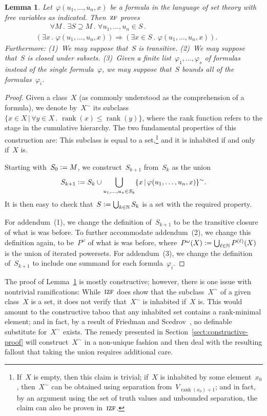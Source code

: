 \documentclass[oneside,reqno]{amsart}
\theoremstyle{definition}
\theoremstyle{plain}
\newtheorem{lemma}[defn]{Lemma}
\theoremstyle{remark}
\newcommand{\NN}{\mathbb{N}}
\newcommand{\defeq}{\vcentcolon=}
\DeclareMathOperator{\rank}{rank}
\renewcommand{\_}{\mathpunct{.}\,}
\newcommand{\?}{\,{:}\,}
\newcommand{\ZF}{\textsc{zf}}
\newcommand{\IZF}{\textsc{izf}}
\begin{document}
\begin{lemma}\label{lemma:zf-smallstep}
Let~$\varphi(u_1,\ldots,u_n,x)$ be a formula in the language of set
theory with free variables as indicated. Then~$\ZF$ proves
\begin{multline*}
  {\qquad}\forall M\_
  \exists S \supseteq M\_
  \forall u_1,\ldots,u_n \in S\_ \\
  (\exists x\_ \varphi(u_1,\ldots,u_n,x)) \Longrightarrow
  (\exists x \in S\_ \varphi(u_1,\ldots,u_n,x)).{\qquad}
\end{multline*}
Furthermore: (1)~We may suppose that~$S$ is transitive. (2)~We may suppose that~$S$ is
closed under subsets. (3)~Given a finite list~$\varphi_1,\ldots,\varphi_s$
of formulas instead of the single formula~$\varphi$, we may suppose that~$S$
bounds all of the formulas~$\varphi_i$.
\end{lemma}

\begin{proof}Given a class~$X$ (as commonly understood as the comprehension of
a formula), we denote by~$X^\sim$ its subclass~$\{ x \in X \,|\, \forall y
\in X\_ \rank(x) \leq \rank(y) \}$, where the rank function refers to the stage
in the cumulative hierarchy. The two fundamental properties of this construction are:
This subclass is equal to a set,\footnote{If~$X$ is empty, then
this claim is trivial; if~$X$ is inhabited by some element~$x_0$, then~$X^\sim$ can
be obtained using separation from~$V_{\rank(x_0)+1}$; and in fact, by an argument
using the set of truth values and unbounded separation, the claim can also be
proven in~$\IZF$.} and it is inhabited if and only if~$X$ is.

Starting with~$S_0 \defeq M$, we construct~$S_{k+1}$ from~$S_k$ as the union
\[ S_{k+1} \defeq S_k \cup \bigcup_{u_1,\ldots,u_n \in S_k} \{ x \,|\,
\varphi(u_1,\ldots,u_n,x) \}^\sim. \]
It is then easy to check that~$S \defeq \bigcup_{k \in \NN} S_k$ is a set with the
required property.

For addendum~(1), we change the definition of~$S_{k+1}$ to be the transitive
closure of what is was before. To further accommodate addendum~(2), we change
this definition again, to be~$P^\omega$ of what is was before,
where~$P^\omega(X) \defeq \bigcup_{\ell \in \NN} P^{(\ell)}(X)$ is the union of
iterated powersets. For addendum~(3), we change the definition of~$S_{k+1}$ to
include one summand for each formula~$\varphi_i$.
\end{proof}

The proof of Lemma~\ref{lemma:zf-smallstep} is mostly constructive; however,
there is one issue with nontrivial ramifications: While~$\IZF$ does show
that the subclass~$X^\sim$ of a given class~$X$ is a set, it does not verify
that~$X^\sim$ is inhabited if~$X$ is. This would amount to the constructive
taboo that any inhabited set contains a rank-minimal element; and in fact, by
a result of Friedman and Scedrov~\cite{XXX}, no definable substitute
for~$X^\sim$ exists. The remedy presented in
Section~\ref{sect:constructive-proof} will construct~$X^\sim$ in a non-unique
fashion and then deal with the resulting fallout that taking the union requires
additional care.
\end{document}
